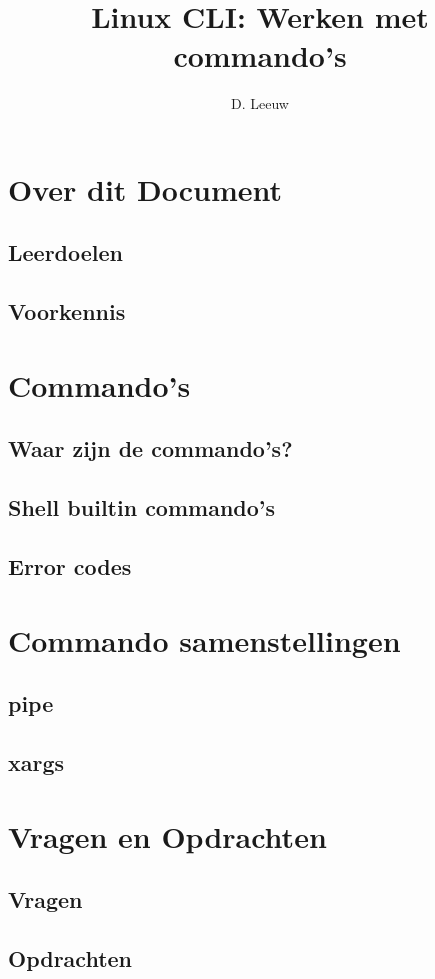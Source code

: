 \documentclass[a4paper,12pt,twoside,openright,titlepage]{article}
\author{D. Leeuw}
\title{Linux CLI: Werken met commando's}
\date{\today\\
\vfill
\raggedright
\copyright\ 2020-2025 Dennis Leeuw\\
}
\begin{document}

\maketitle


\section{Over dit Document}
\subsection{Leerdoelen}

\subsection{Voorkennis}



\section{Commando's}

\subsection{Waar zijn de commando's?}


\subsection{Shell builtin commando's}

\subsection{Error codes}

\section{Commando samenstellingen}

\subsection{pipe}

\subsection{xargs}

\section{Vragen en Opdrachten}
\subsection{Vragen}

\subsection{Opdrachten}


\printindex
\end{document}
